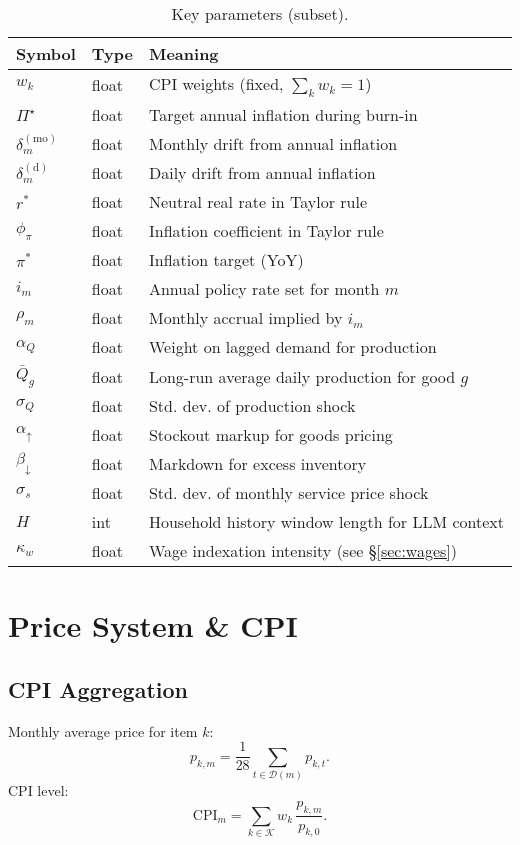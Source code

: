 \documentclass[12pt]{article}
\begin{document}
\begin{table}[!ht]
\centering
\begin{tabular}{llp{7.5cm}}
\toprule
\textbf{Symbol} & \textbf{Type} & \textbf{Meaning} \\
\midrule
$w_k$ & float & CPI weights (fixed, $\sum_k w_k=1$) \\
$\Pi^\star$ & float & Target annual inflation during burn-in \\
$\delta_m^{(\mathrm{mo})}$ & float & Monthly drift from annual inflation \\
$\delta_m^{(\mathrm{d})}$ & float & Daily drift from annual inflation \\
$r^\ast$ & float & Neutral real rate in Taylor rule \\
$\phi_\pi$ & float & Inflation coefficient in Taylor rule \\
$\pi^\ast$ & float & Inflation target (YoY) \\
$i_m$ & float & Annual policy rate set for month $m$ \\
$\rho_m$ & float & Monthly accrual implied by $i_m$ \\
$\alpha_Q$ & float & Weight on lagged demand for production \\
$\bar{Q}_g$ & float & Long-run average daily production for good $g$ \\
$\sigma_Q$ & float & Std. dev. of production shock \\
$\alpha_{\uparrow}$ & float & Stockout markup for goods pricing \\
$\beta_{\downarrow}$ & float & Markdown for excess inventory \\
$\sigma_s$ & float & Std. dev. of monthly service price shock \\
$H$ & int & Household history window length for LLM context \\
$\kappa_w$ & float & Wage indexation intensity (see \S\ref{sec:wages}) \\
\bottomrule
\end{tabular}
\caption{Key parameters (subset).}
\end{table}

\section{Price System \& CPI}
\subsection*{CPI Aggregation}
Monthly average price for item $k$:
$$
p_{k,m}=\frac{1}{28}\sum_{t\in\mathcal{D}(m)} p_{k,t}.
$$
CPI level:
$$
\mathrm{CPI}_m=\sum_{k\in\mathcal{K}} w_k\,\frac{p_{k,m}}{p_{k,0}}.
$$
\end{document}
